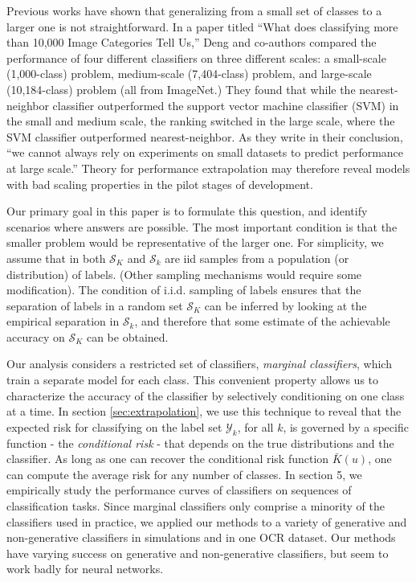 \documentclass[12pt]{article}
\begin{document}
Previous works have shown that generalizing from a small set of classes 
to a larger one is not straightforward. In a paper titled ``What
does classifying more than 10,000 Image Categories Tell Us,'' Deng and
co-authors compared the performance of four different classifiers on
three different scales: a small-scale (1,000-class) problem,
medium-scale (7,404-class) problem, and large-scale (10,184-class)
problem (all from ImageNet.)  They found that while the
nearest-neighbor classifier outperformed the support vector machine
classifier (SVM) in the small and medium scale, the ranking switched
in the large scale, where the SVM classifier outperformed
nearest-neighbor.  As they write in their conclusion, ``we cannot
always rely on experiments on small datasets to predict performance at
large scale.'' Theory for performance
extrapolation may therefore reveal models with bad scaling properties in the
pilot stages of development.

Our primary goal in this paper is to formulate this question, and
identify scenarios where answers are possible. 
The most important condition is that the smaller problem would be 
representative of the larger one. For simplicity, we
assume that in both $\mathcal{S}_K$ and $\mathcal{S}_k$ are iid samples
from a population (or distribution) of labels. (Other sampling 
mechanisms would require some modification). 
The condition of i.i.d. sampling of labels ensures that the
separation of labels in a random set $\mathcal{S}_K$ can be inferred by
looking at the empirical separation in $\mathcal{S}_k$, and
therefore that some estimate of the achievable accuracy on
$\mathcal{S}_K$ can be obtained.

Our analysis considers a restricted set of classifiers,
\emph{marginal classifiers}, which train a separate model for each class. 
This convenient property allows us to
characterize the accuracy of the classifier by selectively
conditioning on one class at a time.  In section \ref{sec:extrapolation}, we use this
technique to reveal that the expected risk for classifying on the
label set $\mathcal{Y}_k$, for all $k$, is governed by a
specific function - the \emph{conditional risk} -  
that depends on the true distributions and the classifier. 
As long as one can recover the conditional risk
function $\bar{K}(u)$, one can compute the average risk for any number
of classes. 
  In section 5, we
empirically study the performance curves of classifiers on sequences
of classification tasks.  Since marginal classifiers only comprise a
minority of the classifiers used in practice, we applied our methods
to a variety of generative and non-generative classifiers in
simulations and in one OCR dataset.  Our methods have varying success
on generative and non-generative classifiers, but seem to work badly
for neural networks.
\end{document}
